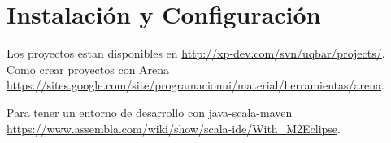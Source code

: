 \section{Instalación y Configuración}
\label{instalation}
Los proyectos estan disponibles en \url{http://xp-dev.com/svn/uqbar/projects/}.
Como crear proyectos con Arena
\url{https://sites.google.com/site/programacionui/material/herramientas/arena}.

Para tener un entorno de desarrollo con java-scala-maven \url{https://www.assembla.com/wiki/show/scala-ide/With_M2Eclipse}. 




